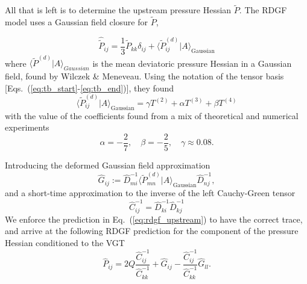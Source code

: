 All that is left is to determine the upstream pressure Hessian $\tilde P$. The RDGF model uses a Gaussian field closure for $\tilde P$,

\begin{equation} \label{eq:rdgf_upstream}
    \hat{\tilde{P}}_{ij} = \frac{1}{3} \tilde{P}_{kk} \delta_{ij} + \langle \tilde{P}^{(d)}_{ij} | A 
    \rangle_{\text{Gaussian}}
\end{equation}
where $\langle \tilde{P}^{(d)} | A\rangle_{Gaussian}$ is the mean deviatoric pressure Hessian in a Gaussian field, found by Wilczek \& Meneveau\cite{wilczek2014pressure}. Using the notation of the tensor basis [Eqs.~(\ref{eq:tb_start}-\ref{eq:tb_end})], they found
\begin{equation}
    \langle \tilde{P}^{(d)}_{ij} | A \rangle_{\text{Gaussian}} = \gamma T^{(2)} + \alpha T^{(3)} + \beta T^{(4)}
\end{equation}
with the value of the coefficients found from a mix of theoretical and numerical experiments
\begin{equation} \label{eq:rdgf_coefs}
    \alpha = -\frac{2}{7}, \quad \beta=-\frac{2}{5}, \quad \gamma \approx 0.08.
\end{equation}

Introducing the deformed Gaussian field approximation
\begin{equation}
    \hat{G}_{ij} := \hat{D}_{mi}^{-1}\langle \tilde{P}_{mn}^{(d)} | A \rangle_{\text{Gaussian}} \hat{D}_{nj}^{-1},
\end{equation}
and a short-time approximation to the inverse of the left Cauchy-Green tensor
\begin{equation}
    \hat{C}^{-1}_{ij} = \hat{D}^{-1}_{ki}\hat{D}^{-1}_{kj}
\end{equation}
We enforce the prediction in Eq.~(\ref{eq:rdgf_upstream}) to have the correct trace, and arrive at the following RDGF prediction for the component of the pressure Hessian conditioned to the VGT
\begin{equation}
    \hat{P}_{ij} = 2Q \frac{\hat{C}^{-1}_{ij}}{\hat{C}^{-1}_{kk}} + \hat{G}_{ij} - \frac{\hat{C}^{-1}_{ij}}{\hat{C}^{-1}_{kk}}\hat{G}_{ll}.
\end{equation}